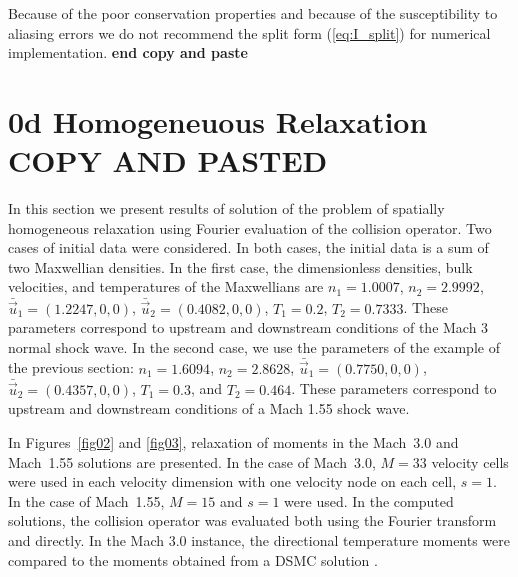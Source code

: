 \documentclass[12pt]{CSUNthesis}
\begin{document}
Because of the poor conservation properties and because of the 
susceptibility to aliasing errors we do not recommend the 
split form (\ref{eq:I_split}) for numerical implementation. 
\textbf{end copy and paste}

\section{0d Homogeneuous Relaxation COPY AND PASTED}

In this section we present results of solution of the problem of 
spatially homogeneous relaxation using Fourier evaluation of the 
collision operator. Two cases of initial data were considered. In 
both cases, the initial data is a sum of two Maxwellian densities. 
In the first case, the 
dimensionless densities, bulk velocities, and temperatures of the 
Maxwellians are $n_1=1.0007$, $n_2=2.9992$, 
$\bar{\vec{u}}_{1}=(1.2247,0,0)$, $\bar{\vec{u}}_{2}=(0.4082,0,0)$,
$T_{1}=0.2$, $T_{2}=0.7333$. These parameters correspond to upstream 
and downstream conditions of the Mach 3 normal shock wave.  
In the second case, we use the parameters of the example of the previous  
section: $n_{1}=1.6094$, $n_{2}=2.8628$, $\bar{\vec{u}}_{1}=(0.7750,0,0)$, $\bar{\vec{u}}_{2}=(0.4357,0,0)$, $T_{1}=0.3$, and $T_{2}=0.464$. These 
parameters correspond to upstream and downstream conditions of a Mach 1.55 
shock wave. 

In Figures~{\ref{fig02}} and {\ref{fig03}}, relaxation of moments in the 
Mach~3.0 and Mach~1.55 solutions are presented. In the case of Mach~3.0, 
$M=33$ velocity cells were used in each velocity dimension with one 
velocity node on each cell, $s=1$. In the case of Mach~1.55, $M=15$ and $s=1$ 
were used. In the computed solutions, the collision operator was evaluated 
both using the Fourier transform and directly. In the Mach 3.0 instance, the directional 
temperature moments were compared to the moments obtained from a DSMC solution
\cite{Boyd1991411}. 
\end{document}
